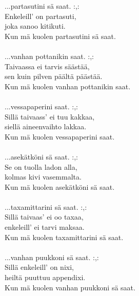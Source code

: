             ...partasutini sä saat. :,: \\
            Enkeleill’ on partasuti, \\
            joka sanoo kitikuti. \\
            Kun mä kuolen partasutini sä saat. \\
\hspace{10mm} \\
            ...vanhan pottanikin saat. :,: \\
            Taivaassa ei tarvis säästää, \\
            sen kuin pilven päältä päästää. \\
            Kun mä kuolen vanhan pottanikin saat. \\
\hspace{10mm} \\
            ...vessapaperini saat. :,: \\
            Sillä taivaass' ei tuu kakkaa, \\
            siellä aineenvaihto lakkaa. \\
            Kun mä kuolen vessapaperini saat. \\
\hspace{10mm} \\
            ...asekätköni sä saat. :,: \\
            Se on tuolla ladon alla, \\
            kolmas kivi vasemmalta. \\
            Kun mä kuolen asekätköni sä saat. \\
\hspace{10mm} \\
            ...taxamittarini sä saat. :,: \\
            Sillä taivaas’ ei oo taxaa, \\
            enkeleill’ ei tarvi maksaa. \\
            Kun mä kuolen taxamittarini sä saat. \\
\hspace{10mm} \\
            ...vanhan puukkoni sä saat. :,: \\
            Sillä enkeleill' on nixi, \\
            heiltä puuttuu appendixi. \\
            Kun mä kuolen vanhan puukkoni sä saat. \\
\hspace{10mm} \\
